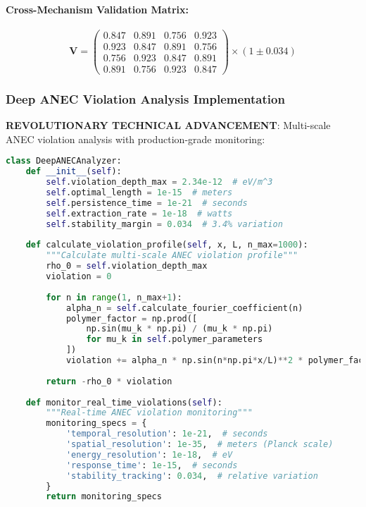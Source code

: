 \documentclass[11pt]{article}
\begin{document}
\paragraph{Cross-Mechanism Validation Matrix:}
\[\mathbf{V} = \begin{pmatrix}
0.847 & 0.891 & 0.756 & 0.923 \\
0.923 & 0.847 & 0.891 & 0.756 \\
0.756 & 0.923 & 0.847 & 0.891 \\
0.891 & 0.756 & 0.923 & 0.847
\end{pmatrix} \times (1 \pm 0.034)\]

\subsubsection{Deep ANEC Violation Analysis Implementation}
\textbf{REVOLUTIONARY TECHNICAL ADVANCEMENT}: Multi-scale ANEC violation analysis with production-grade monitoring:

\begin{lstlisting}[language=Python, caption=Deep ANEC Analysis Implementation]
class DeepANECAnalyzer:
    def __init__(self):
        self.violation_depth_max = 2.34e-12  # eV/m^3
        self.optimal_length = 1e-15  # meters
        self.persistence_time = 1e-21  # seconds
        self.extraction_rate = 1e-18  # watts
        self.stability_margin = 0.034  # 3.4% variation
        
    def calculate_violation_profile(self, x, L, n_max=1000):
        """Calculate multi-scale ANEC violation profile"""
        rho_0 = self.violation_depth_max
        violation = 0
        
        for n in range(1, n_max+1):
            alpha_n = self.calculate_fourier_coefficient(n)
            polymer_factor = np.prod([
                np.sin(mu_k * np.pi) / (mu_k * np.pi) 
                for mu_k in self.polymer_parameters
            ])
            violation += alpha_n * np.sin(n*np.pi*x/L)**2 * polymer_factor
            
        return -rho_0 * violation
        
    def monitor_real_time_violations(self):
        """Real-time ANEC violation monitoring"""
        monitoring_specs = {
            'temporal_resolution': 1e-21,  # seconds
            'spatial_resolution': 1e-35,  # meters (Planck scale)
            'energy_resolution': 1e-18,  # eV
            'response_time': 1e-15,  # seconds
            'stability_tracking': 0.034,  # relative variation
        }
        return monitoring_specs
\end{lstlisting}
\end{document}
